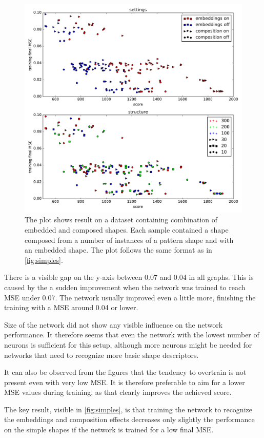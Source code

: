 \begin{figure}
\centering
\includegraphics[width=\linewidth]{ext/figure_x_cmb.pdf}
\caption{The plot shows result on a dataset containing combination of embedded and composed shapes. Each sample contained a shape composed from a number of instances of a pattern shape and with an embedded shape. The plot follows the same format as in \cref{fig:simples}.}
\label{fig:cmb}
\end{figure}

There is a visible gap on the y-axis between $0.07$ and $0.04$ in all graphs. This is caused by the a sudden improvement when the network was trained to reach MSE under 0.07. The network usually improved even a little more, finishing the training with a MSE around 0.04 or lower.

Size of the network did not show any visible influence on the network performance. It therefore seems that even the network with the lowest number of neurons is sufficient for this setup, although more neurons might be needed for networks that need to recognize more basic shape descriptors.

It can also be observed from the figures that the tendency to overtrain is not present even with very low MSE. It is therefore preferable to aim for a lower MSE values during training, as that clearly improves the achieved score.

The key result, visible in \cref{fig:simples}, is that training the network to recognize the embeddings and composition effects decreases only slightly the performance on the simple shapes if the network is trained for a low final MSE.

